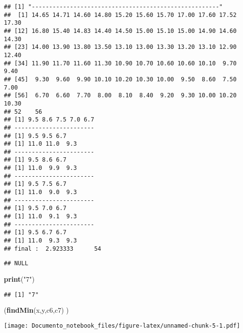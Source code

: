 \documentclass[]{article}
\newenvironment{Shaded}{\begin{snugshade}}{\end{snugshade}}
\newcommand{\KeywordTok}[1]{\textcolor[rgb]{0.13,0.29,0.53}{\textbf{#1}}}
\newcommand{\StringTok}[1]{\textcolor[rgb]{0.31,0.60,0.02}{#1}}
\newcommand{\NormalTok}[1]{#1}
\begin{document}
\begin{verbatim}
## [1] "------------------------------------------------------"
##  [1] 14.65 14.71 14.60 14.80 15.20 15.60 15.70 17.00 17.60 17.52 17.30
## [12] 16.80 15.40 14.83 14.40 14.50 15.00 15.10 15.00 14.90 14.60 14.30
## [23] 14.00 13.90 13.80 13.50 13.10 13.00 13.30 13.20 13.10 12.90 12.40
## [34] 11.90 11.70 11.60 11.30 10.90 10.70 10.60 10.60 10.10  9.70  9.40
## [45]  9.30  9.60  9.90 10.10 10.20 10.30 10.00  9.50  8.60  7.50  7.00
## [56]  6.70  6.60  7.70  8.00  8.10  8.40  9.20  9.30 10.00 10.20 10.30
## 52    56 
## [1] 9.5 8.6 7.5 7.0 6.7
## -----------------------
## [1] 9.5 9.5 6.7
## [1] 11.0 11.0  9.3
## -----------------------
## [1] 9.5 8.6 6.7
## [1] 11.0  9.9  9.3
## -----------------------
## [1] 9.5 7.5 6.7
## [1] 11.0  9.0  9.3
## -----------------------
## [1] 9.5 7.0 6.7
## [1] 11.0  9.1  9.3
## -----------------------
## [1] 9.5 6.7 6.7
## [1] 11.0  9.3  9.3
## final :  2.923333      54
\end{verbatim}

\begin{verbatim}
## NULL
\end{verbatim}

\begin{Shaded}
\begin{Highlighting}[]
\KeywordTok{print}\NormalTok{(}\StringTok{"7"}\NormalTok{)}
\end{Highlighting}
\end{Shaded}

\begin{verbatim}
## [1] "7"
\end{verbatim}

\begin{Shaded}
\begin{Highlighting}[]
\NormalTok{(}\KeywordTok{findMin}\NormalTok{(x,y,c6,c7) )}
\end{Highlighting}
\end{Shaded}

\texttt{[image: Documento\_notebook\_files/figure-latex/unnamed-chunk-5-1.pdf]}
\end{document}
